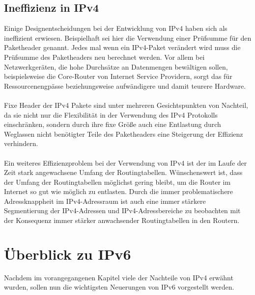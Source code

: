 \documentclass[a4paper,12pt]{scrartcl}
\begin{document}
\subsection{Ineffizienz in IPv4}
Einige Designentscheidungen bei der Entwicklung von IPv4 haben sich als ineffizient erwiesen. Beispielhaft sei hier die Verwendung einer Prüfsumme für den Paketheader genannt. Jedes mal wenn ein IPv4-Paket verändert wird muss die Prüfsumme des Paketheaders neu berechnet werden. Vor allem bei Netzwerkgeräten, die hohe Durchsätze an Datenmengen bewältigen sollen, beispielsweise die Core-Router von Internet Service Providern, sorgt das für Ressourcenengpässe beziehungsweise aufwändigere und damit teurere Hardware.\\
\\
Fixe Header der IPv4 Pakete sind unter mehreren Gesichtspunkten von Nachteil, da sie nicht nur die Flexibilität in der Verwendung des IPv4 Protokolls einschränken, sondern durch ihre fixe Größe auch eine Entlastung durch Weglassen nicht benötigter Teile des Paketheaders eine Steigerung der Effizienz verhindern.  \\
\\
Ein weiteres Effizienzproblem bei der Verwendung von IPv4 ist der im Laufe der Zeit stark angewachsene Umfang der Routingtabellen. Wünschenswert ist, dass der Umfang der Routingtabellen möglichst gering bleibt, um die Router im Internet so gut wie möglich zu entlasten. Durch die immer problematischere Adressknappheit im IPv4-Adressraum ist auch eine immer stärkere Segmentierung der IPv4-Adressen und IPv4-Adressbereiche zu beobachten mit der Konsequenz immer stärker anwachsender Routingtabellen in den Routern.\\



\section{\"Uberblick zu IPv6}
\label{sec:2}
Nachdem im vorangegangenen Kapitel viele der Nachteile von IPv4 erwähnt wurden, sollen nun die wichtigsten Neuerungen von IPv6 vorgestellt werden. 
\end{document}
